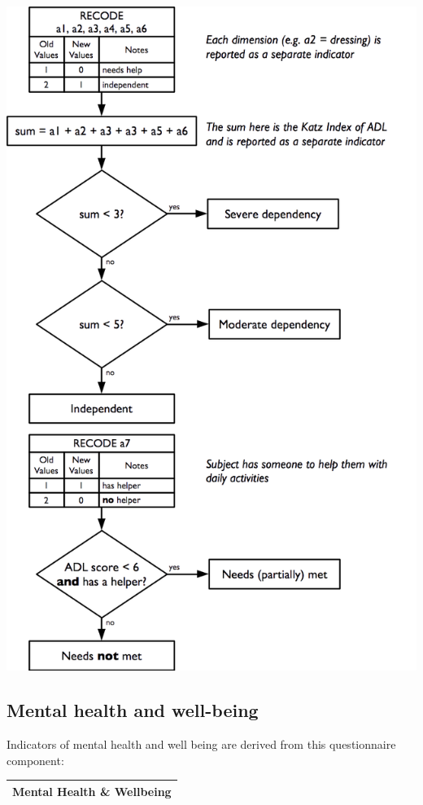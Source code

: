 \documentclass[12pt,a4paper]{book}
\theoremstyle{definition}
\theoremstyle{definition}
\theoremstyle{definition}
\theoremstyle{remark}
\begin{document}
\begin{center}\includegraphics[width=800pt]{figures/indicators18} \end{center}

\hypertarget{mental-health-and-well-being}{%
\subsection{Mental health and
well-being}\label{mental-health-and-well-being}}

Indicators of mental health and well being are derived from this
questionnaire component:

\begin{longtable}[]{@{}c@{}}
\toprule
\begin{minipage}[t]{0.97\columnwidth}\centering
\textbf{Mental Health \& Wellbeing}\strut
\end{minipage}\tabularnewline
\bottomrule
\end{longtable}
\end{document}

